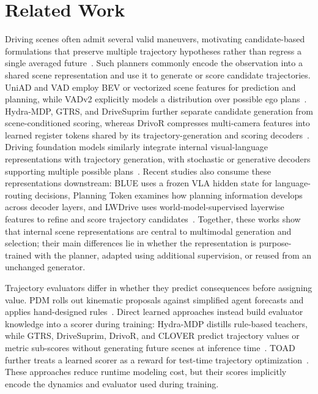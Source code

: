 \section{Related Work}
\label{sec:related}

Driving scenes often admit several valid maneuvers, motivating candidate-based formulations that preserve multiple trajectory hypotheses rather than regress a single averaged future~\cite{chai2019multipath,ettinger2021waymo}.
Such planners commonly encode the observation into a shared scene representation and use it to generate or score candidate trajectories.
UniAD and VAD employ BEV or vectorized scene features for prediction and planning, while VADv2 explicitly models a distribution over possible ego plans~\cite{hu2023uniad,jiang2023vad,chen2024vadv2}.
Hydra-MDP, GTRS, and DriveSuprim further separate candidate generation from scene-conditioned scoring, whereas DrivoR compresses multi-camera features into learned register tokens shared by its trajectory-generation and scoring decoders~\cite{li2024hydramdp,li2025gtrs,yao2026drivesuprim,kirby2026drivor}.
Driving foundation models similarly integrate internal visual-language representations with trajectory generation, with stochastic or generative decoders supporting multiple possible plans~\cite{shao2024lmdrive,tian2024drivevlm,hwang2024emma,alpamayo2025}.
Recent studies also consume these representations downstream: BLUE uses a frozen VLA hidden state for language-routing decisions, Planning Token examines how planning information develops across decoder layers, and LWDrive uses world-model-supervised layerwise features to refine and score trajectory candidates~\cite{ling2026blue,babu2026planningtoken,yang2026lwdrive}.
Together, these works show that internal scene representations are central to multimodal generation and selection; their main differences lie in whether the representation is purpose-trained with the planner, adapted using additional supervision, or reused from an unchanged generator.

Trajectory evaluators differ in whether they predict consequences before assigning value.
PDM rolls out kinematic proposals against simplified agent forecasts and applies hand-designed rules~\cite{dauner2023pdm}.
Direct learned approaches instead build evaluator knowledge into a scorer during training: Hydra-MDP distills rule-based teachers, while GTRS, DriveSuprim, DrivoR, and CLOVER predict trajectory values or metric sub-scores without generating future scenes at inference time~\cite{li2024hydramdp,li2025gtrs,yao2026drivesuprim,kirby2026drivor,ang2026clover}.
TOAD further treats a learned scorer as a reward for test-time trajectory optimization~\cite{xu2026toad}.
These approaches reduce runtime modeling cost, but their scores implicitly encode the dynamics and evaluator used during training.

